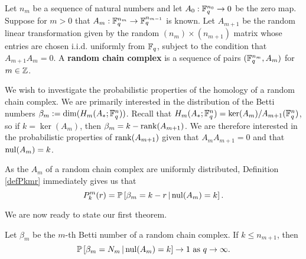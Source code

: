%

\begin{definition} 
  \label{defn:random_chain_cx}
  Let $n_m$ be a sequence of natural numbers and let $A_0:\mathbb{F}_q^{n_0} \to 0$ be the zero map. 
  Suppose for $m>0$ that
  $A_{m}:\mathbb{F}_q^{n_m} \to \mathbb{F}_q^{n_{m-1}}$ is known. Let $A_{m+1}$ be the random linear
  transformation given by the random $(n_{m})\times (n_{m+1})$ matrix whose entries are
  chosen i.i.d. uniformly from $\mathbb{F}_q$, subject to the condition that $A_{m+1}A_{m}
  = 0$.
  A {\bf random chain complex} is a sequence of pairs $(\mathbb{F}_q^{n_m},A_m)$ for $m \in \mathbb{Z}$.
\end{definition}

We wish to investigate the probabilistic properties of the homology of a random
chain complex.  We are primarily interested in the distribution of the Betti
numbers $\beta_m := \dim(H_m(A_\ast; \mathbb{F}_q^{n}))$.  Recall that
$H_m(A_\ast;\mathbb{F}_q^{n}) = \ker (A_{m})/ A_{m+1}(\mathbb{F}_q^{n})$, so if $k= \ker(A_m)$,
then $\beta_m = k - \operatorname{\mathrm{rank}}(A_{m+1})$.  We are therefore interested in the
probabilistic properties of $\operatorname{\mathrm{rank}}(A_{m+1})$ given that $A_{m}A_{m+1} = 0$ and
that $\mathrm{nul}(A_{m}) = k$. 


\begin{remark}
As the $A_m$ of a random chain complex are uniformly distributed, Definition
\ref{defPkmr} immediately gives us that
\[
  P^m_k(r) = \mathbb{P}\left[\beta_m = k-r \,|\, \mathrm{nul}(A_{m}) = k\right].
\]
\end{remark}



We are now ready to state our first theorem.


\begin{lemma}
  \label{lem:condqtoinfty}
Let $\beta_m$ be the $m$-th Betti number of a random chain complex.  If $k\leq n_{m+1}$, then
\[
\mathbb{P}\left[\beta_m=N_m \,|\, \mathrm{nul}(A_{m}) = k \right] \to 1 \textrm{ as } q\to\infty.
\]
\end{lemma}

